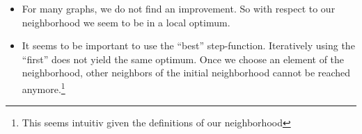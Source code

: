 \documentclass{scrartcl}
\begin{document}
\begin{itemize}
  \item For many graphs, we do not find an improvement. So with respect to our neighborhood we
  seem to be in a local optimum. 
  \item It seems to be important to use the ``best''
    step-function. Iteratively using the ``first'' does not yield the
    same optimum. Once we choose an element of the neighborhood, other
    neighbors of the initial neighborhood cannot be reached
    anymore.\footnote{This seems intuitiv given the definitions of our
      neighborhood}
\end{itemize}





\begin{landscape}
\begin{table}
  \scriptsize
  
\caption{Local search results. For each instance, we show the number of crossings (first row), the iteration 
needed to reach the local optimum (second row, first value) and the run-time of our algorithm (second row, second value).
If no local optimum was found the number of iterations is -1. }
\label{tab:results}
\end{table}
\end{landscape}
\end{document}
